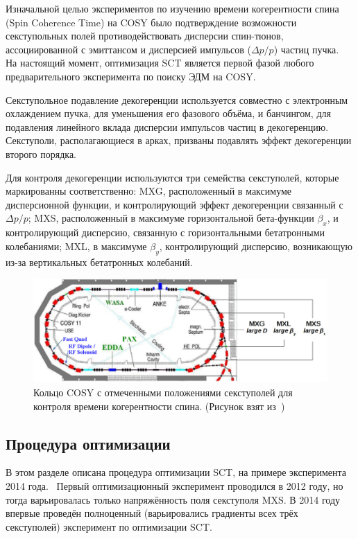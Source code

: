 \newcommand{\dpop}{\Delta p/p}

Изначальной целью экспериментов по изучению времени когерентности спина (Spin Coherence Time) на COSY было подтверждение возможности секступольных полей противодействовать дисперсии спин-тюнов, ассоциированной с 
эмиттансом и дисперсией импульсов ($\dpop$) частиц пучка.~\cite{COSY:SCT:IPAC15} На настоящий момент, оптимизация SCT является первой фазой любого предварительного эксперимента по поиску ЭДМ на COSY.

Секступольное подавление декогеренции используется совместно с электронным охлаждением пучка, для
уменьшения его фазового объёма, и банчингом, для подавления линейного вклада дисперсии импульсов частиц 
в декогеренцию. Секступоли, располагающиеся в арках, призваны подавлять эффект декогеренции второго порядка.

Для контроля декогеренции используются три семейства секступолей, которые маркированны соответственно: MXG, расположенный в максимуме дисперсионной функции, и контролирующий эффект декогеренции связанный с $\dpop$; MXS, расположенный в максимуме горизонтальной бета-функции $\beta_x$, и контролирующий дисперсию, связанную с горизонтальными бетатронными колебаниями; MXL, в максимуме $\beta_y$, контролирующий дисперсию, возникающую из-за вертикальных бетатронных колебаний.

\begin{figure}[H]\centering
	\includegraphics[width=\linewidth]{images/chapter4/COSY-sextupoles}
	\caption{Кольцо COSY с отмеченными положениями секступолей для контроля времени когерентности спина. (Рисунок взят из~\cite{Guidoboni:STORI14})}
\end{figure}

\subsection{Процедура оптимизации}
В этом разделе описана процедура оптимизации SCT, на примере эксперимента 2014 года.~\cite{Guidoboni:STORI14} Первый оптимизационный эксперимент проводился в 2012 году, но тогда варьировалась только напряжённость поля секступоля MXS. В 2014 году впервые проведён полноценный (варьировались градиенты всех трёх секступолей) эксперимент по оптимизации SCT. 

